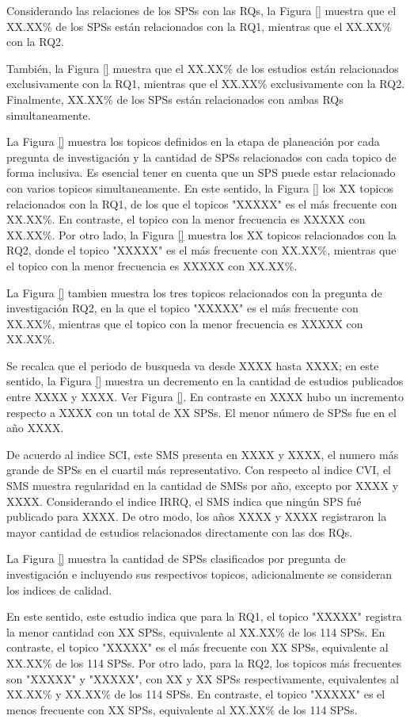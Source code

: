 Considerando las relaciones de los SPSs con las RQs, la Figura \ref{} muestra que el XX.XX\% de los SPSs están relacionados con la RQ1, mientras que el XX.XX\% con la RQ2.

También, la Figura \ref{} muestra que el XX.XX\% de los estudios están relacionados exclusivamente con la RQ1, mientras que el XX.XX\% exclusivamente con la RQ2. Finalmente, XX.XX\% de los SPSs están relacionados con ambas RQs simultaneamente.

La Figura \ref{} muestra los topicos definidos en la etapa de planeación por cada pregunta de investigación y la cantidad de SPSs relacionados con cada topico de forma inclusiva. Es esencial tener en cuenta que un SPS puede estar relacionado con varios topicos simultaneamente. En este sentido, la Figura \ref{} los XX topicos relacionados con la RQ1, de los que el topicos "XXXXX" es el más frecuente con XX.XX\%. En contraste, el topico con la menor frecuencia es XXXXX con XX.XX\%. Por otro lado, la Figura \ref{} muestra los XX topicos relacionados con la RQ2, donde el topico "XXXXX" es el más frecuente con XX.XX\%, mientras que el topico con la menor frecuencia es XXXXX con XX.XX\%.

La Figura \ref{} tambien muestra los tres topicos relacionados con la pregunta de investigación RQ2, en la que el topico "XXXXX" es el más frecuente con XX.XX\%, mientras que el topico con la menor frecuencia es XXXXX con XX.XX\%.

Se recalca que el periodo de busqueda va desde XXXX hasta XXXX; en este sentido, la Figura \ref{} muestra un decremento en la cantidad de estudios publicados entre XXXX y XXXX. Ver Figura \ref{}. En contraste en XXXX hubo un incremento respecto a XXXX con un total de XX SPSs. El menor número de SPSs fue en el año XXXX.

De acuerdo al indice SCI, este SMS presenta en XXXX y XXXX, el numero más grande de SPSs en el cuartil más representativo. Con respecto al indice CVI, el SMS muestra regularidad en la cantidad de SMSs por año, excepto por XXXX y XXXX. Considerando el indice IRRQ, el SMS indica que ningún SPS fué publicado para XXXX. De otro modo, los años XXXX y XXXX registraron la mayor cantidad de estudios relacionados directamente con las dos RQs.

La Figura \ref{} muestra la cantidad de SPSs clasificados por pregunta de investigación e incluyendo sus respectivos topicos, adicionalmente se consideran los indices de calidad.

En este sentido, este estudio indica que para la RQ1, el topico "XXXXX" registra la menor cantidad con XX SPSs, equivalente al XX.XX\% de los 114 SPSs. En contraste, el topico "XXXXX" es el más frecuente con XX SPSs, equivalente al XX.XX\% de los 114 SPSs. Por otro lado, para la RQ2, los topicos más frecuentes son "XXXXX" y "XXXXX", con XX y XX SPSs respectivamente, equivalentes al XX.XX\% y XX.XX\% de los 114 SPSs. En contraste, el topico "XXXXX" es el menos frecuente con XX SPSs, equivalente al XX.XX\% de los 114 SPSs.

